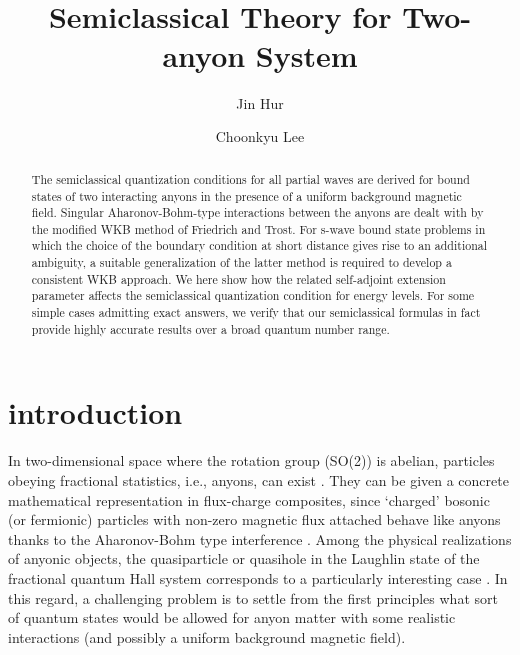 \documentclass[a4paper,aps,eqsecnum,preprint,preprintnumbers,12pt]{revtex4}
\begin{document}
\title{\hspace{1cm}\\\hspace{1cm}\\\hspace{1cm}\\Semiclassical Theory for Two-anyon System}
\author{Jin Hur} 
\author{Choonkyu Lee} 

\begin{abstract}
The semiclassical quantization conditions for all partial waves
are derived for bound states of two interacting anyons in the
presence of a uniform background magnetic field. Singular
Aharonov-Bohm-type interactions between the anyons are dealt with
by the modified WKB method of Friedrich and Trost. For s-wave
bound state problems in which the choice of the boundary condition
at short distance gives rise to an additional ambiguity, a
suitable generalization of the latter method is required to
develop a consistent WKB approach. We here show how the related
self-adjoint extension parameter affects the semiclassical
quantization condition for energy levels. For some simple cases
admitting exact answers, we verify that our semiclassical formulas
in fact provide highly accurate results over a broad quantum
number range.
\end{abstract}
\maketitle

\section{introduction}

In two-dimensional space where the rotation group (SO(2)) is
abelian, particles obeying fractional statistics, i.e., anyons,
can exist \cite{leinaas, wilczek, khare, lerda}. They can be given
a concrete mathematical representation in flux-charge composites,
since `charged' bosonic (or fermionic) particles with non-zero
magnetic flux attached behave like anyons thanks to the
Aharonov-Bohm type interference \cite{aharonov}. Among the
physical realizations of anyonic objects, the quasiparticle or
quasihole in the Laughlin state of the fractional quantum Hall
system corresponds to a particularly interesting case
\cite{arovas}. In this regard, a challenging problem is to settle
from the first principles what sort of quantum states would be
allowed for anyon matter with some realistic interactions (and
possibly a uniform background magnetic field).
\end{document}

